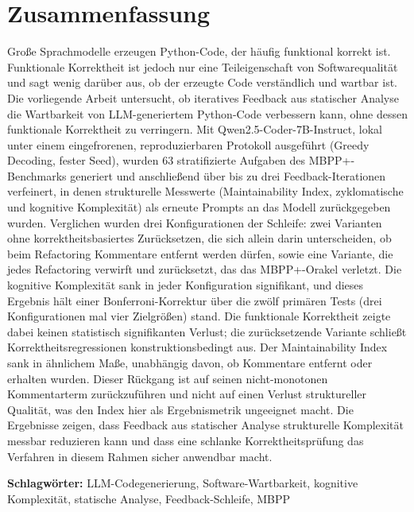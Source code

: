 %
%
%

\thispagestyle{empty}

\section*{Zusammenfassung}

\noindent
Große Sprachmodelle erzeugen Python-Code, der häufig funktional korrekt ist.
Funktionale Korrektheit ist jedoch nur eine Teileigenschaft von Softwarequalität
und sagt wenig darüber aus, ob der erzeugte Code verständlich und wartbar ist. Die
vorliegende Arbeit untersucht, ob iteratives Feedback aus statischer Analyse die
Wartbarkeit von LLM-generiertem Python-Code verbessern kann, ohne dessen
funktionale Korrektheit zu verringern. Mit Qwen2.5-Coder-7B-Instruct, lokal unter
einem eingefrorenen, reproduzierbaren Protokoll ausgeführt (Greedy Decoding,
fester Seed), wurden 63 stratifizierte Aufgaben des MBPP+-Benchmarks generiert und
anschließend über bis zu drei Feedback-Iterationen verfeinert, in denen
strukturelle Messwerte (Maintainability Index, zyklomatische und kognitive
Komplexität) als erneute Prompts an das Modell zurückgegeben wurden. Verglichen
wurden drei Konfigurationen der Schleife: zwei Varianten ohne korrektheitsbasiertes
Zurücksetzen, die sich allein darin unterscheiden, ob beim Refactoring Kommentare
entfernt werden dürfen, sowie eine Variante, die jedes Refactoring
verwirft und zurücksetzt, das das MBPP+-Orakel verletzt. Die kognitive Komplexität
sank in jeder Konfiguration signifikant, und dieses Ergebnis hält einer
Bonferroni-Korrektur über die zwölf primären Tests (drei Konfigurationen mal vier
Zielgrößen) stand. Die funktionale
Korrektheit zeigte dabei keinen statistisch signifikanten Verlust; die zurücksetzende Variante schließt
Korrektheitsregressionen konstruktionsbedingt aus. Der
Maintainability Index sank in ähnlichem Maße, unabhängig davon, ob Kommentare
entfernt oder erhalten wurden. Dieser Rückgang ist auf seinen nicht-monotonen
Kommentarterm zurückzuführen und nicht auf einen Verlust struktureller Qualität,
was den Index hier als Ergebnismetrik ungeeignet macht. Die Ergebnisse
zeigen, dass Feedback aus statischer Analyse strukturelle Komplexität messbar
reduzieren kann und dass eine schlanke Korrektheitsprüfung das Verfahren in diesem
Rahmen sicher anwendbar macht.

\vspace{0.8em}
\noindent\textbf{Schlagwörter:} LLM-Codegenerierung, Software-Wartbarkeit,
kognitive Komplexität, statische Analyse, Feedback-Schleife, MBPP
